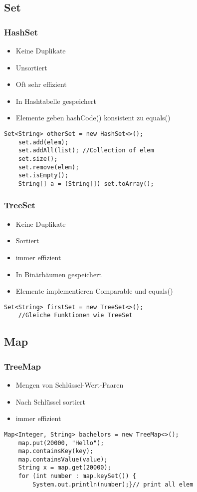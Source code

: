 \begin{multicols*}{5}
	\subsection{Set}
		\subsubsection{HashSet}
		\begin{itemize}
			\item Keine Duplikate
			\item Unsortiert 
			\item Oft sehr effizient
			\item In Hashtabelle gespeichert
			\item Elemente geben hashCode() konsistent zu equals()
		\end{itemize}
		\begin{lstlisting}
Set<String> otherSet = new HashSet<>();
	set.add(elem);
	set.addAll(list); //Collection of elem
	set.size();
	set.remove(elem);
	set.isEmpty();
	String[] a = (String[]) set.toArray();
		\end{lstlisting}
		\subsubsection{TreeSet}
		\begin{itemize}
			\item Keine Duplikate
			\item Sortiert
			\item immer effizient
			\item In Binärbäumen gespeichert
			\item Elemente implementieren Comparable und equals()
		\end{itemize}
		\begin{lstlisting}
Set<String> firstSet = new TreeSet<>();
	//Gleiche Funktionen wie TreeSet
		\end{lstlisting}
	
	\subsection{Map}
		\subsubsection{TreeMap}
		\begin{itemize}
			\item Mengen von Schlüssel-Wert-Paaren
			\item Nach Schlüssel sortiert
			\item immer effizient
		\end{itemize}
		\begin{lstlisting}
Map<Integer, String> bachelors = new TreeMap<>();
	map.put(20000, "Hello");
	map.containsKey(key);
	map.containsValue(value);
	String x = map.get(20000);
	for (int number : map.keySet()) { 
		System.out.println(number);}// print all elem
		\end{lstlisting}

\end{multicols*}

